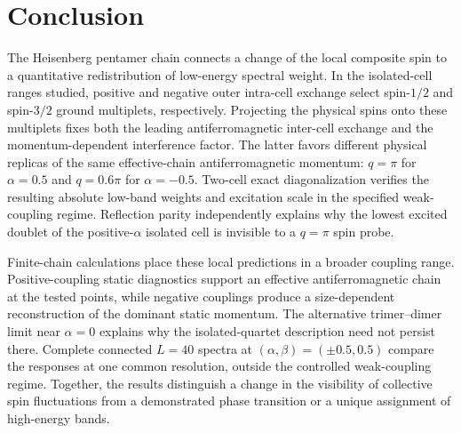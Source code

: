 \section{Conclusion}
\label{sec:conclusion}

The Heisenberg pentamer chain connects a change of the local composite spin
to a quantitative redistribution of low-energy spectral weight.
In the isolated-cell ranges studied, positive and negative outer intra-cell
exchange select spin-$1/2$ and spin-$3/2$ ground multiplets, respectively.
Projecting the physical spins onto these multiplets fixes both the leading
antiferromagnetic inter-cell exchange and the momentum-dependent interference
factor. The latter favors different physical replicas of the same
effective-chain antiferromagnetic momentum: $q=\pi$ for $\alpha=0.5$ and
$q=0.6\pi$ for $\alpha=-0.5$.
Two-cell exact diagonalization verifies the resulting absolute low-band
weights and excitation scale in the specified weak-coupling regime.
Reflection parity independently explains why the lowest excited doublet of
the positive-$\alpha$ isolated cell is invisible to a $q=\pi$ spin probe.

Finite-chain calculations place these local predictions in a broader
coupling range. Positive-coupling static diagnostics support an effective
antiferromagnetic chain at the tested points, while negative couplings
produce a size-dependent reconstruction of the dominant static momentum.
The alternative trimer--dimer limit near $\alpha=0$ explains why the
isolated-quartet description need not persist there.
Complete connected $L=40$ spectra at $(\alpha,\beta)=(\pm0.5,0.5)$ compare
the responses at one common resolution, outside the controlled
weak-coupling regime. Together, the results distinguish a change in the
visibility of collective spin fluctuations from a demonstrated phase
transition or a unique assignment of high-energy bands.
